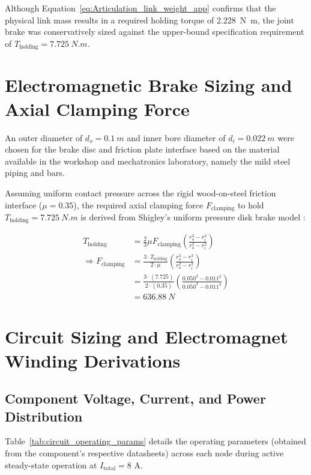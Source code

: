 Although Equation~\ref{eq:Articulation_link_weight_app} confirms that the physical link mass results in a required holding torque of \SI{2.228}{N.m}, the joint brake was conservatively sized against the upper-bound specification requirement of $T_{\text{holding}} = \SI{7.725}{N.m}$.

\section{Electromagnetic Brake Sizing and Axial Clamping Force}
\label{sec:brake_sizing_calc}

An outer diameter of $d_o = \SI{0.1}{m}$ and inner bore diameter of $d_i = \SI{0.022}{m}$ were chosen for the brake disc and friction plate interface based on the material available in the workshop and mechatronics laboratory, namely the mild steel piping and bars. 

Assuming uniform contact pressure across the rigid wood-on-steel friction interface ($\mu = 0.35$), the required axial clamping force $F_{\text{clamping}}$ to hold $T_{\text{holding}} = \SI{7.725}{N.m}$ is derived from Shigley's uniform pressure disk brake model \citep{Shigley:2015}:

\begin{equation}
	\label{eq:F_holding_app}
	\begin{aligned}
		T_{\text{holding}} &= \frac{2}{3} \mu F_{\text{clamping}} \left( \frac{r_o^3 - r_i^3}{r_o^2 - r_i^2} \right) \\[1ex]
		\Rightarrow F_{\text{clamping}} &= \frac{3 \cdot T_{\text{holding}}}{2 \cdot \mu }\left( \frac{r_o^3 - r_i^3}{r_o^2 - r_i^2} \right) \\
		&= \frac{3 \cdot (7.725)}{2 \cdot (0.35) } \left( \frac{0.050^2 - 0.011^2}{0.050^3 - 0.011^3} \right)\\
		&= \SI{636.88}{N}
	\end{aligned}
\end{equation}

\section{Circuit Sizing and Electromagnet Winding Derivations}
\label{app:design_calc}

\subsection{Component Voltage, Current, and Power Distribution}
Table~\ref{tab:circuit_operating_params} details the operating parameters (obtained from the component's respective datasheets) across each node during active steady-state operation at $I_{\text{total}} = 8\text{ A}$.

